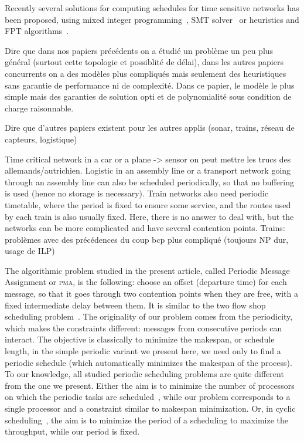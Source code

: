 \documentclass[10pt, conference, letterpaper]{IEEEtran}
\newcommand\pma{\textsc{pma}\xspace}
\begin{document}
Recently several solutions for computing schedules for time sensitive networks has been proposed, using mixed integer programming~\cite{nayak2017incremental,steiner2018traffic}, SMT solver~\cite{dos2019tsnsched} or heuristics and FPT algorithms~\cite{barth2018deterministic}.

Dire que dans nos papiers précédents on a étudié un problème un peu plus général (surtout cette topologie et possiblité de délai), dans les autres papiers concurrents on a des modèles plus compliqués mais seulement des heuristiques sans garantie de performance ni de complexité. 
Dans ce papier, le modèle le plus simple mais des garanties de solution opti et de polynomialité sous condition de charge raisonnable.

Dire que d'autres papiers existent pour les autres applis (sonar, trains, réseau de capteurs, logistique)


Time critical network in a car or a plane -> sensor on peut mettre les trucs des allemands/autrichien.
Logistic in an assembly line or a transport network going through an assembly line can also be scheduled
periodically, so that no buffering is used (hence no storage is necessary). 
Train networks also need periodic timetable, where the period is fixed to ensure some service, and the routes 
used by each train is also usually fixed. Here, there is no answer to deal with, but the networks can be more complicated and
have several contention points. 
Trains: problèmes avec des précédences du coup bcp plus compliqué (toujours NP dur, usage de ILP)



The algorithmic problem studied in the present article, called Periodic Message Assignment or \pma, is the following: choose an offset (departure time) for each message, so that it goes through two contention points when they are free, with a fixed intermediate delay between them. It is  similar to the two flow shop scheduling problem~\cite{yu2004minimizing}. The originality of our problem comes from the periodicity, which makes the constraints different: messages from consecutive periods can interact. The objective is classically to minimize the makespan, or schedule length, in the simple periodic variant we present here, we need only to find a periodic schedule (which automatically minimizes the makespan of the process). 
 To our knowledge, all studied periodic scheduling problems are quite different from the one we present.
Either the aim is to minimize the number of processors on which the periodic tasks are scheduled~\cite{korst1991periodic,hanen1993cyclic}, while our problem corresponds to a single processor and a constraint similar to makespan minimization. Or, in cyclic scheduling~\cite{levner2010complexity}, the aim is to minimize the period of a scheduling to maximize the throughput, while our period is fixed. 
\end{document}
